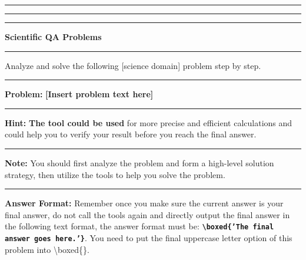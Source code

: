 \begin{tcolorbox}[
colframe=gray!30,
colback=gray!5,
coltitle=black!100,
title=\textit{\textbf{Prompt Template for Scientific QA Problems}}
]

\rule{1.0\textwidth}{0.4pt}
\hrule
\vspace{0.3ex}
\hrule

\begin{center}
    \textbf{\large Scientific QA Problems}
\end{center}
\vspace{-0.8em}
\rule{1.0\textwidth}{0.4pt}

Analyze and solve the following [science domain] problem step by step.

\rule{1.0\textwidth}{0.4pt}

\textbf{Problem:} \textcolor{violet!90}{\textbf{[Insert problem text here]}}

\rule{1.0\textwidth}{0.4pt}

\textbf{Hint:} \textcolor{blue!80!black}{\textbf{The tool could be used}} for more precise and efficient calculations and could help you to verify your result before you reach the final answer.

\rule{1.0\textwidth}{0.4pt}

\textbf{Note:} You should first analyze the problem and form a high-level solution strategy, then utilize the tools to help you solve the problem.

\rule{1.0\textwidth}{0.4pt}

\textbf{Answer Format:} Remember once you make sure the current answer is your final answer, do not call the tools again and directly output the final answer in the following text format, the answer format must be: \textcolor{red!50!black}{\textbf{\texttt{\textbackslash{}boxed\{'The final answer goes here.'\}}}}. You need to put the final uppercase letter option of this problem into \textbackslash{}boxed\{\}.

\end{tcolorbox}
















